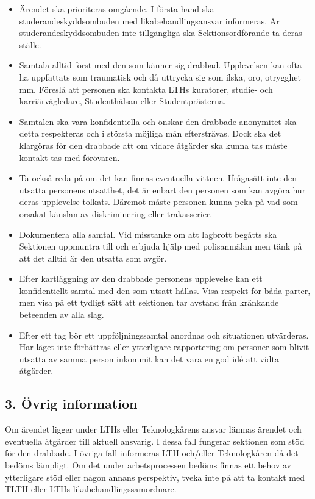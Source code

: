 \documentclass[10pt]{article}
\begin{document}
\begin{itemize}
    \item Ärendet ska prioriteras omgående. I första hand ska studerandeskyddsombuden med likabehandlingsansvar informeras. Är studerandeskyddsombuden inte tillgängliga ska Sektionsordförande ta deras ställe.
    \item Samtala alltid först med den som känner sig drabbad. Upplevelsen kan ofta ha uppfattats som traumatisk och då uttrycka sig som ilska, oro, otrygghet mm. Föreslå att personen ska kontakta LTHs kuratorer, studie- och karriärvägledare, Studenthälsan eller Studentprästerna.
    \item Samtalen ska vara konfidentiella och önskar den drabbade anonymitet ska detta respekteras och i största möjliga mån eftersträvas. Dock ska det klargöras för den drabbade att om vidare åtgärder ska kunna tas måste kontakt tas med förövaren.
    \item Ta också reda på om det kan finnas eventuella vittnen. Ifrågasätt inte den utsatta personens utsatthet, det är enbart den personen som kan avgöra hur deras upplevelse tolkats. Däremot måste personen kunna peka på vad som orsakat känslan av diskriminering eller trakasserier.
    \item Dokumentera alla samtal. Vid misstanke om att lagbrott begåtts ska Sektionen uppmuntra till och erbjuda hjälp med polisanmälan men tänk på att det alltid är den utsatta som avgör.
    \item Efter kartläggning av den drabbade personens upplevelse kan ett konfidentiellt samtal med den som utsatt hållas. Visa respekt för båda parter, men visa på ett tydligt sätt att sektionen tar avstånd från kränkande beteenden av alla slag.
    \item Efter ett tag bör ett uppföljningssamtal anordnas och situationen utvärderas. Har läget inte förbättras eller ytterligare rapportering om personer som blivit utsatta av samma person inkommit  kan det vara en god idé att vidta åtgärder.
\end{itemize}

\subsection*{3. Övrig information}
Om ärendet ligger under LTHs eller Teknologkårens ansvar lämnas ärendet och eventuella åtgärder till aktuell ansvarig. I dessa fall fungerar sektionen som stöd för den drabbade. I övriga fall informeras LTH och/eller Teknologkåren då det bedöms lämpligt. Om det under arbetsprocessen bedöms finnas ett behov av ytterligare stöd eller någon annans perspektiv, tveka inte på att ta kontakt med TLTH eller LTHs likabehandlingssamordnare.
\end{document}
